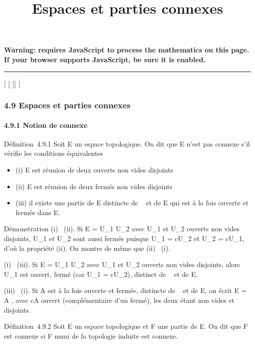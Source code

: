 \documentclass[]{article}
\title{Espaces et parties connexes}
\author{}
\date{}
\begin{document}
\maketitle

\textbf{Warning: 
requires JavaScript to process the mathematics on this page.\\ If your
browser supports JavaScript, be sure it is enabled.}

\begin{center}\rule{3in}{0.4pt}\end{center}

[
[
[]
[

\subsubsection{4.9 Espaces et parties connexes}

\paragraph{4.9.1 Notion de connexe}

Définition~4.9.1 Soit E un espace topologique. On dit que E n'est pas
connexe s'il vérifie les conditions équivalentes

\begin{itemize}
\itemsep1pt\parskip0pt
\item
  (i) E est réunion de deux ouverts non vides disjoints
\item
  (ii) E est réunion de deux fermés non vides disjoints
\item
  (iii) il existe une partie de E distincte de \varnothing~ et de E qui est à la
  fois ouverte et fermée dans E.
\end{itemize}

Démonstration (i) \rigtharrow~(ii). Si E = U_1 \cup U_2 avec
U_1 et U_2 ouverts non vides disjoints, U_1
et U_2 sont aussi fermés puisque U_1 = cU_2
et U_2 = cU_1, d'où la propriété (ii). On montre de
même que (ii) \rigtharrow~(i).

(i) \rigtharrow~(iii). Si E = U_1 \cup U_2 avec U_1 et
U_2 ouverts non vides disjoints, alors U_1 est ouvert,
fermé (car U_1 = cU_2), distinct de \varnothing~ et de E.

(iii) \rigtharrow~(i). Si A est à la fois ouverte et fermée, distincte de \varnothing~ et de
E, on écrit E = A \cupcA, avec cA ouvert (complémentaire d'un fermé), les
deux étant non vides et disjoints.

Définition~4.9.2 Soit E un espace topologique et F une partie de E. On
dit que F est connexe si F muni de la topologie induite est connexe.
\end{document}
